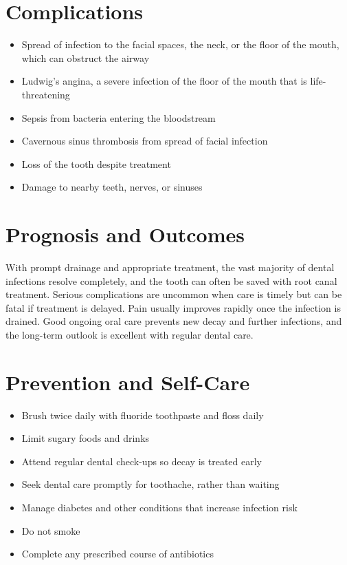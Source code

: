 \section*{Complications}
\begin{itemize}
    \item Spread of infection to the facial spaces, the neck, or the floor of the mouth, which can obstruct the airway
    \item Ludwig's angina, a severe infection of the floor of the mouth that is life-threatening
    \item Sepsis from bacteria entering the bloodstream
    \item Cavernous sinus thrombosis from spread of facial infection
    \item Loss of the tooth despite treatment
    \item Damage to nearby teeth, nerves, or sinuses
\end{itemize}

\section*{Prognosis and Outcomes}
With prompt drainage and appropriate treatment, the vast majority of dental infections resolve completely, and the tooth can often be saved with root canal treatment. Serious complications are uncommon when care is timely but can be fatal if treatment is delayed. Pain usually improves rapidly once the infection is drained. Good ongoing oral care prevents new decay and further infections, and the long-term outlook is excellent with regular dental care.

\section*{Prevention and Self-Care}
\begin{itemize}
    \item Brush twice daily with fluoride toothpaste and floss daily
    \item Limit sugary foods and drinks
    \item Attend regular dental check-ups so decay is treated early
    \item Seek dental care promptly for toothache, rather than waiting
    \item Manage diabetes and other conditions that increase infection risk
    \item Do not smoke
    \item Complete any prescribed course of antibiotics
\end{itemize}

